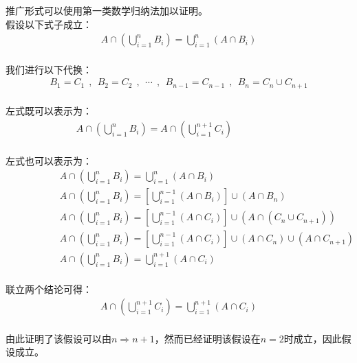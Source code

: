 \documentclass[UTF8]{ctexart}
\begin{document}
    推广形式可以使用第一类数学归纳法加以证明。\\[3mm]
    假设以下式子成立：
    \setcounter{equation}{0}
    \begin{align}
        A\cap\left(\bigcup_{i=1}^n B_i\right)=\bigcup_{i=1}^n(A\cap B_i)
    \end{align}\\
    我们进行以下代换：
    \begin{align}
        B_1=C_1~~,~~B_2=C_2~~,~~\cdots~~,~~B_{n-1}=C_{n-1}~~,~~B_n=C_n\cup C_{n+1}
    \end{align}\\
    左式既可以表示为：
    \begin{align}
        A\cap\left(\bigcup_{i=1}^n B_i\right)=A\cap\left(\bigcup_{i=1}^{n+1} C_i\right)~~~~~~~~~~~~~~~~~~~~~~~
    \end{align}\\
    左式也可以表示为：
    \begin{align}
        &~~~~~~~~~~~~~~~~~~~~A\cap\left(\bigcup_{i=1}^n B_i\right)=\bigcup_{i=1}^n(A\cap B_i)\\[3mm]
        &~~~~~~~~~~~~~~~~~~~~A\cap\left(\bigcup_{i=1}^n B_i\right)=\left[\bigcup_{i=1}^{n-1}(A\cap B_i)\right]\cup(A\cap B_n)\\[3mm]
        &~~~~~~~~~~~~~~~~~~~~A\cap\left(\bigcup_{i=1}^n B_i\right)=\left[\bigcup_{i=1}^{n-1}(A\cap C_i)\right]\cup(A\cap (C_n\cup C_{n+1}))\\[3mm]
        &~~~~~~~~~~~~~~~~~~~~A\cap\left(\bigcup_{i=1}^n B_i\right)=\left[\bigcup_{i=1}^{n-1}(A\cap C_i)\right]\cup(A\cap C_n)\cup(A\cap C_{n+1})\\[3mm]
        &~~~~~~~~~~~~~~~~~~~~A\cap\left(\bigcup_{i=1}^n B_i\right)=\bigcup_{i=1}^{n+1}(A\cap C_i)
    \end{align}\\
    联立两个结论可得：
    \begin{align}
        A\cap\left(\bigcup_{i=1}^{n+1} C_i\right)=\bigcup_{i=1}^{n+1}(A\cap C_i)
    \end{align}\\
    由此证明了该假设可以由$n\Rightarrow n+1$，然而已经证明该假设在$n=2$时成立，因此假设成立。

\newpage
\end{document}
